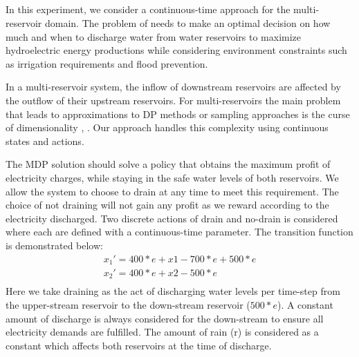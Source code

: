 \subsection{\WaterReservoir}

In this experiment, we consider a continuous-time approach for the multi-reservoir domain. The problem of \WaterReservoir  needs to make an optimal decision on how much and when to discharge water from water reservoirs to maximize hydroelectric energy productions while considering environment constraints such as irrigation requirements and flood prevention. 

In a multi-reservoir system, the inflow of downstream reservoirs are affected by the outflow of their upstream reservoirs. 
For multi-reservoirs the main problem that leads to approximations to DP methods or sampling approaches is the curse of dimensionality \cite{Mahootchi2009}, \cite{Yeh1985}. Our approach handles this complexity using continuous states and actions.


The MDP solution should solve a policy that obtains the maximum profit of electricity charges, while staying in the safe water levels of both reservoirs. We allow the system to choose to drain at any time to meet this requirement. The choice of not draining will not gain any profit as we reward according to the electricity discharged. Two discrete actions of drain and no-drain is considered where each are defined with a continuous-time parameter. 
The transition function is demonstrated below: 
{\footnotesize
\begin{align*}
x_1'  = 400 * e + x1 -700 * e + 500 * e \\
x_2'  = 400 * e + x2 - 500 * e \\
\end{align*}
}
Here we take draining as the act of discharging water levels per time-step from the upper-stream reservoir to the down-stream reservoir ($500 * e$). A constant amount of discharge is always considered for the down-stream to ensure all electricity demands are fulfilled.  The amount of rain (r) is considered as a constant which affects both reservoirs at the time of discharge. 

